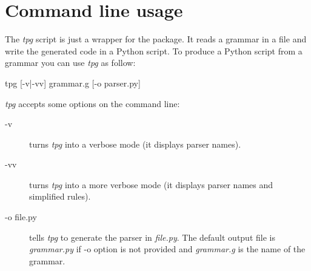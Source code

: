 \section{Command line usage}

The \emph{tpg} script is just a wrapper for the package.
It reads a grammar in a file and write the generated code in a Python script.
To produce a Python script from a grammar you can use \emph{tpg} as follow:

\begin{verbatimtab}[4]
	tpg [-v|-vv] grammar.g [-o parser.py]
\end{verbatimtab}

\emph{tpg} accepts some options on the command line:

\begin{description}
	\item [-v] turns \emph{tpg} into a verbose mode (it displays parser names).
	\item [-vv] turns \emph{tpg} into a more verbose mode (it displays parser names and simplified rules).
	\item [-o file.py] tells \emph{tpg} to generate the parser in \emph{file.py}. The default output file is \emph{grammar.py} if -o option is not provided and \emph{grammar.g} is the name of the grammar.
\end{description}
